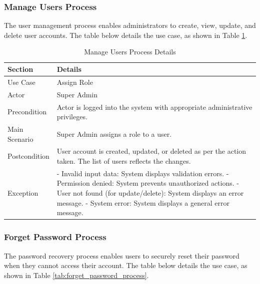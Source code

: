 \subsubsection{Manage Users Process}
The user management process enables administrators to create, view, update, and delete user accounts. The table below details the use case, as shown in Table \ref{tab:manage_users_process}.


\begin{table}[htbp]
    \centering
    \begin{tabular}{|l|p{}|}
        \hline
        \textbf{Section} & \textbf{Details} \\
        \hline
        Use Case & Assign Role \\
        \hline
        Actor & Super Admin \\
        \hline
        Precondition & Actor is logged into the system with appropriate administrative privileges. \\
        \hline
        Main Scenario & 
        Super Admin assigns a role to a user. \\
        \hline
        Postcondition & User account is created, updated, or deleted as per the action taken. The list of users reflects the changes. \\
        \hline
        Exception & 
        - Invalid input data: System displays validation errors.
        - Permission denied: System prevents unauthorized actions.
        - User not found (for update/delete): System displays an error message.
        - System error: System displays a general error message. \\
        \hline
    \end{tabular}
    \caption{Manage Users Process Details}
    \label{tab:manage_users_process}
\end{table}

\subsubsection{Forget Password Process}
The password recovery process enables users to securely reset their password when they cannot access their account. The table below details the use case, as shown in Table \ref{tab:forget_password_process}.

\newpage

